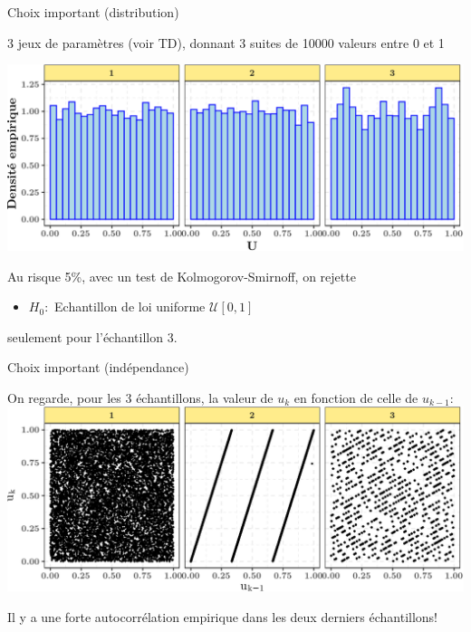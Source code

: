 \documentclass[ignorenonframetext,]{beamer}
\providecommand{\tightlist}{%
  \setlength{\itemsep}{0pt}\setlength{\parskip}{0pt}}
\begin{document}
\begin{frame}{Choix important (distribution)}
\protect\hypertarget{choix-important-distribution}{}

3 jeux de paramètres (voir TD), donnant 3 suites de 10000 valeurs entre
0 et 1

\includegraphics{diapos_simulation_variables_aleatoires_files/figure-beamer/plot_histogrammes_empiriques-1.pdf}

Au risque 5\%, avec un test de Kolmogorov-Smirnoff, on rejette

\begin{itemize}
\tightlist
\item
  \(H_0:\) Echantillon de loi uniforme \(\mathcal{U}[0, 1]\)
\end{itemize}

seulement pour l'échantillon 3.

\end{frame}

\begin{frame}{Choix important (indépendance)}
\protect\hypertarget{choix-important-induxe9pendance}{}

On regarde, pour les 3 échantillons, la valeur de \(u_k\) en fonction de
celle de \(u_{k-1}\):
\includegraphics{diapos_simulation_variables_aleatoires_files/figure-beamer/plot_autocorrelations_empiriques-1.pdf}

Il y a une forte autocorrélation empirique dans les deux derniers
échantillons!

\end{frame}
\end{document}
